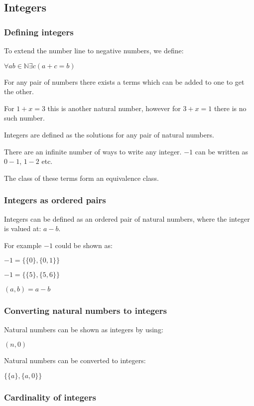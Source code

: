 \subsection{Integers}

\subsubsection{Defining integers}

To extend the number line to negative numbers, we define:

\(\forall ab \in \mathbb{N} \exists c (a+c=b)\)

For any pair of numbers there exists a terms which can be added to one to get the other.

For \(1+x=3\) this is another natural number, however for \(3+x=1\) there is no such number.

Integers are defined as the solutions for any pair of natural numbers.

There are an infinite number of ways to write any integer. \(-1\) can be written as \(0-1\), \(1-2\) etc.

The class of these terms form an equivalence class.

\subsubsection{Integers as ordered pairs}

Integers can be defined as an ordered pair of natural numbers, where the integer is valued at: \(a-b\).

For example \(-1\) could be shown as:

\(-1= \{ \{ 0 \},\{0,1\}\}\)

\(-1= \{ \{ 5 \},\{5,6\}\}\)

\((a,b)=a-b\)

\subsubsection{Converting natural numbers to integers}

Natural numbers can be shown as integers by using:

\((n,0)\)

Natural numbers can be converted to integers:

\(\{\{a\},\{a,0\}\}\)
\subsubsection{Cardinality of integers}

